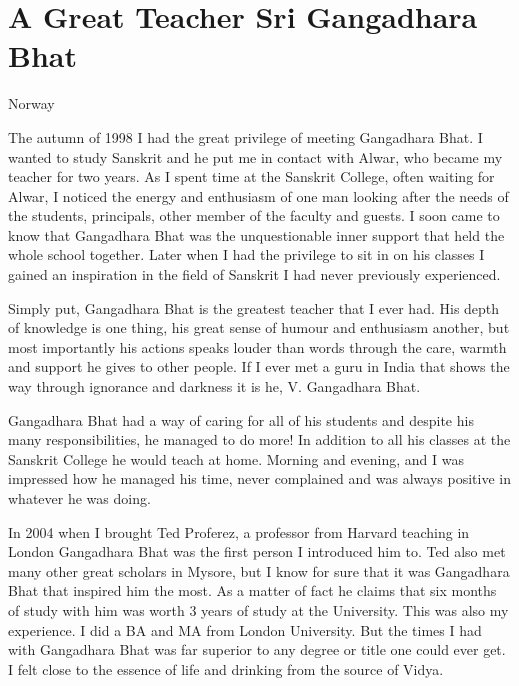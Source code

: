 \chapter{A Great Teacher Sri Gangadhara Bhat}

\begin{center}

\smallskip

Norway
\addrule
\end{center}

The autumn of 1998 I had the great privilege of meeting Gangadhara Bhat. I wanted to study Sanskrit and he put me in contact with Alwar, who became my teacher for two years. As I spent time at the Sanskrit College, often waiting for Alwar, I noticed the energy and enthusiasm of one man looking after the needs of the students, principals, other member of the faculty and guests. I soon came to know that Gangadhara Bhat was the unquestionable inner support that held the whole school together. Later when I had the privilege to sit in on his classes I gained an inspiration in the field of Sanskrit I had never previously experienced.

Simply put, Gangadhara Bhat is the greatest teacher that I ever had. His depth of knowledge is one thing, his great sense of humour and enthusiasm another, but most importantly his actions speaks louder than words through the care, warmth and support he gives to other people. If I ever met a guru in India that shows the way through ignorance and darkness it is he, V. Gangadhara Bhat.

Gangadhara Bhat had a way of caring for all of his students and despite his many responsibilities, he managed to do more! In addition to all his classes at the Sanskrit College he would teach at home. Morning and evening, and I was impressed how he managed his time, never complained and was always positive in whatever he was doing.

In 2004 when I brought Ted Proferez, a professor from Harvard teaching in London Gangadhara Bhat was the first person I introduced him to. Ted also met many other great scholars in Mysore, but I know for sure that it was Gangadhara Bhat that inspired him the most. As a matter of fact he claims that six months of study with him was worth 3 years of study at the University. This was also my experience. I did a BA and MA from London University. But the times I had with Gangadhara Bhat was far superior to any degree or title one could ever get. I felt close to the essence of life and drinking from the source of Vidya.

